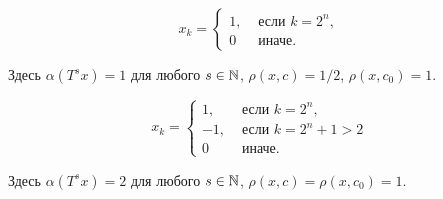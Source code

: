 \begin{example}
	\begin{equation}
		x_k = \begin{cases}
			1, &\mbox{~если~} k = 2^n,
			\\
			0 &\mbox{~иначе.}
		\end{cases}
	\end{equation}
\end{example}
Здесь $\alpha(T^s x) = 1$ для любого $s\in\mathbb{N}$, $\rho(x,c) = 1/2$, $\rho(x, c_0) = 1$.

\begin{example}
	\begin{equation}
		x_k = \begin{cases}
			1, &\mbox{~если~} k = 2^n,
			\\
			-1, &\mbox{~если~} k = 2^n + 1 > 2
			\\
			0 &\mbox{~иначе.}
		\end{cases}
	\end{equation}
\end{example}
Здесь $\alpha(T^s x) = 2$ для любого $s\in\mathbb{N}$, $\rho(x,c) = \rho(x, c_0) = 1$.
